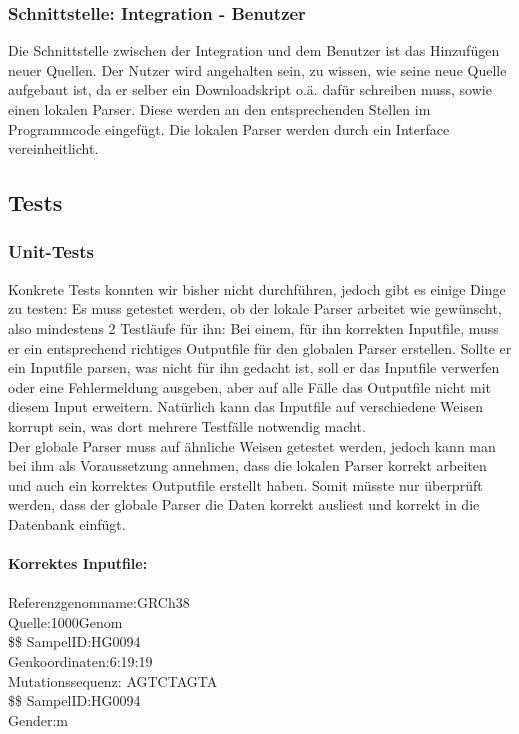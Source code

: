 \subsubsection{Schnittstelle: Integration - Benutzer}
Die Schnittstelle zwischen der Integration und dem Benutzer ist das Hinzufügen neuer Quellen. Der Nutzer wird angehalten sein, zu wissen, wie seine neue Quelle aufgebaut ist, da er selber ein Downloadskript o.ä. dafür schreiben muss, sowie einen lokalen Parser. Diese werden an den entsprechenden Stellen im Programmcode eingefügt. Die lokalen Parser werden durch ein Interface vereinheitlicht.
\subsection{Tests}
\subsubsection{Unit-Tests}
Konkrete Tests konnten wir bisher nicht durchführen, jedoch gibt es einige Dinge zu testen: Es muss getestet werden, ob der lokale Parser arbeitet wie gewünscht, also mindestens 2 Testläufe für ihn: Bei einem, für ihn korrekten Inputfile, muss er ein entsprechend richtiges Outputfile für den globalen Parser erstellen. Sollte er ein Inputfile parsen, was nicht für ihn gedacht ist, soll er das Inputfile verwerfen oder eine Fehlermeldung ausgeben, aber auf alle Fälle das Outputfile nicht mit diesem Input erweitern. Natürlich kann das Inputfile auf verschiedene Weisen korrupt sein, was dort mehrere Testfälle notwendig macht.\\
Der globale Parser muss auf ähnliche Weisen getestet werden, jedoch kann man bei ihm als Voraussetzung annehmen, dass die lokalen Parser korrekt arbeiten und auch ein korrektes Outputfile erstellt haben. Somit müsste nur überprüft werden, dass der globale Parser die Daten korrekt ausliest und korrekt in die Datenbank einfügt.\\
\\
\textbf{Korrektes Inputfile:}\\
\\
Referenzgenomname:GRCh38\\
Quelle:1000Genom\\
\$\$
SampelID:HG0094\\
Genkoordinaten:6:19:19\\
Mutationssequenz: AGTCTAGTA\\
\$\$
SampelID:HG0094\\
Gender:m\\
